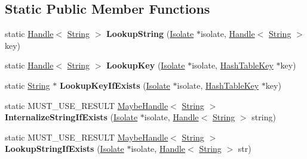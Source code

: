 \subsection*{Static Public Member Functions}
\begin{DoxyCompactItemize}
\item 
static \hyperlink{classv8_1_1internal_1_1_handle}{Handle}$<$ \hyperlink{classv8_1_1internal_1_1_string}{String} $>$ {\bfseries Lookup\+String} (\hyperlink{classv8_1_1internal_1_1_isolate}{Isolate} $\ast$isolate, \hyperlink{classv8_1_1internal_1_1_handle}{Handle}$<$ \hyperlink{classv8_1_1internal_1_1_string}{String} $>$ key)\hypertarget{classv8_1_1internal_1_1_string_table_a1e5bbfa11d1d3e127cf8040931b9e55e}{}\label{classv8_1_1internal_1_1_string_table_a1e5bbfa11d1d3e127cf8040931b9e55e}

\item 
static \hyperlink{classv8_1_1internal_1_1_handle}{Handle}$<$ \hyperlink{classv8_1_1internal_1_1_string}{String} $>$ {\bfseries Lookup\+Key} (\hyperlink{classv8_1_1internal_1_1_isolate}{Isolate} $\ast$isolate, \hyperlink{classv8_1_1internal_1_1_hash_table_key}{Hash\+Table\+Key} $\ast$key)\hypertarget{classv8_1_1internal_1_1_string_table_a764dd5a6358422bace060c88d83153af}{}\label{classv8_1_1internal_1_1_string_table_a764dd5a6358422bace060c88d83153af}

\item 
static \hyperlink{classv8_1_1internal_1_1_string}{String} $\ast$ {\bfseries Lookup\+Key\+If\+Exists} (\hyperlink{classv8_1_1internal_1_1_isolate}{Isolate} $\ast$isolate, \hyperlink{classv8_1_1internal_1_1_hash_table_key}{Hash\+Table\+Key} $\ast$key)\hypertarget{classv8_1_1internal_1_1_string_table_a19c036185666f520e9a17d585fadc16d}{}\label{classv8_1_1internal_1_1_string_table_a19c036185666f520e9a17d585fadc16d}

\item 
static M\+U\+S\+T\+\_\+\+U\+S\+E\+\_\+\+R\+E\+S\+U\+LT \hyperlink{classv8_1_1internal_1_1_maybe_handle}{Maybe\+Handle}$<$ \hyperlink{classv8_1_1internal_1_1_string}{String} $>$ {\bfseries Internalize\+String\+If\+Exists} (\hyperlink{classv8_1_1internal_1_1_isolate}{Isolate} $\ast$isolate, \hyperlink{classv8_1_1internal_1_1_handle}{Handle}$<$ \hyperlink{classv8_1_1internal_1_1_string}{String} $>$ string)\hypertarget{classv8_1_1internal_1_1_string_table_a5509f3ee730f00ea06a3f739314c2774}{}\label{classv8_1_1internal_1_1_string_table_a5509f3ee730f00ea06a3f739314c2774}

\item 
static M\+U\+S\+T\+\_\+\+U\+S\+E\+\_\+\+R\+E\+S\+U\+LT \hyperlink{classv8_1_1internal_1_1_maybe_handle}{Maybe\+Handle}$<$ \hyperlink{classv8_1_1internal_1_1_string}{String} $>$ {\bfseries Lookup\+String\+If\+Exists} (\hyperlink{classv8_1_1internal_1_1_isolate}{Isolate} $\ast$isolate, \hyperlink{classv8_1_1internal_1_1_handle}{Handle}$<$ \hyperlink{classv8_1_1internal_1_1_string}{String} $>$ str)\hypertarget{classv8_1_1internal_1_1_string_table_aa7e11f1d3d9f1de7ba5d278dd28ee063}{}\label{classv8_1_1internal_1_1_string_table_aa7e11f1d3d9f1de7ba5d278dd28ee063}


\end{DoxyCompactItemize}
